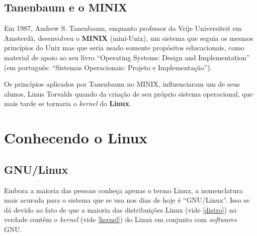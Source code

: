 \documentclass{handout_utfpr}
\begin{document}
\subsection{Tanenbaum e o MINIX}
Em 1987, Andrew S. Tanenbaum, enquanto professor da Vrije Universiteit em Amsterdã, desenvolveu o \textbf{MINIX} (mini-Unix), um sistema que seguia os mesmos princípios do Unix mas que seria usado somente propósitos educacionais, como material de apoio ao seu livro ``Operating Systems: Design and Implementation'' (em português: ``Sistemas Operacionais: Projeto e Implementação'').

Os princípios aplicados por Tanenbaum no MINIX, influenciaram um de seus alunos, Linus Torvalds quando da criação de seu próprio sistema operacional, que mais tarde se tornaria o \textit{kernel} do \textbf{Linux}.






\section{Conhecendo o Linux}

\subsection{GNU/Linux}
Embora a maioria das pessoas conheça apenas o termo Linux, a nomenclatura mais acurada para o sistema que se usa nos dias de hoje é ``GNU/Linux''. Isso se dá devido ao fato de que a maioria das distribuições Linux (vide \ref{distro}) na verdade contêm o \textit{kernel} (vide \ref{kernel}) do Linux em conjunto com \textit{softwares} GNU.
\end{document}
